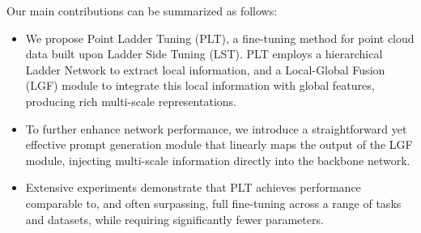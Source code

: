 Our main contributions can be summarized as follows:

\begin{itemize}
\item We propose Point Ladder Tuning (PLT), a fine-tuning method for point cloud data built upon Ladder Side Tuning (LST). PLT employs a hierarchical Ladder Network to extract local information, and a Local-Global Fusion (LGF) module to integrate this local information with global features, producing rich multi-scale representations.
\item To further enhance network performance, we introduce a straightforward yet effective prompt generation module that linearly maps the output of the LGF module, injecting multi-scale information directly into the backbone network.
\item Extensive experiments demonstrate that PLT achieves performance comparable to, and often surpassing, full fine-tuning across a range of tasks and datasets, while requiring significantly fewer parameters.
\end{itemize}


